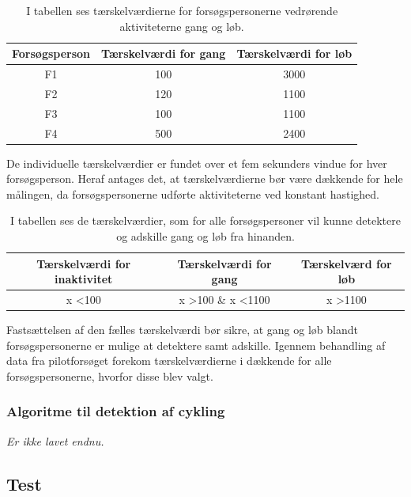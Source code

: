 \begin{table}[H]
	\centering
	\begin{tabular}{ccc}
		\hline
		\rowcolor[HTML]{C0C0C0} 
		Forsøgsperson & Tærskelværdi for gang & Tærskelværdi for løb \\ \hline
		\rowcolor[HTML]{FFFFFF} 
		F1 & 100 & 3000 \\ \hline
		\rowcolor[HTML]{FFFFFF} 
		F2 & 120 & 1100 \\ \hline
		\rowcolor[HTML]{FFFFFF} 
		F3 & 100 & 1100 \\ \hline
		\rowcolor[HTML]{FFFFFF} 
		F4 & 500 & 2400 \\ \hline
	\end{tabular}
	\caption{I tabellen ses tærskelværdierne for forsøgspersonerne vedrørende aktiviteterne gang og løb.}
	\label{tab:individuel_taerskel}
\end{table}\vspace{-0.5cm}
De individuelle tærskelværdier er fundet over et fem sekunders vindue for hver forsøgsperson. Heraf antages det, at tærskelværdierne bør være dækkende for hele målingen, da forsøgspersonerne udførte aktiviteterne ved konstant hastighed.
\begin{table}[H]
	\centering
	\begin{tabular}{ccc}
		\hline
		\rowcolor[HTML]{C0C0C0} 
		Tærskelværdi for inaktivitet & Tærskelværdi for gang & Tærskelværd for løb \\ \hline
		x \textless 100 & x \textgreater 100 \& x \textless 1100 & x \textgreater 1100 \\ \hline
	\end{tabular}
	\caption{I tabellen ses de tærskelværdier, som for alle forsøgspersoner vil kunne detektere og adskille gang og løb fra hinanden.}
	\label{tab:faelles_taerskel}
\end{table}\vspace{-0.5cm}
Fastsættelsen af den fælles tærskelværdi bør sikre, at gang og løb blandt forsøgspersonerne er mulige at detektere samt adskille. Igennem behandling af data fra pilotforsøget forekom tærskelværdierne i  dækkende for alle forsøgspersonerne, hvorfor disse blev valgt.

\subsubsection{Algoritme til detektion af cykling}
\textit{Er ikke lavet endnu.}

\subsection{Test}
